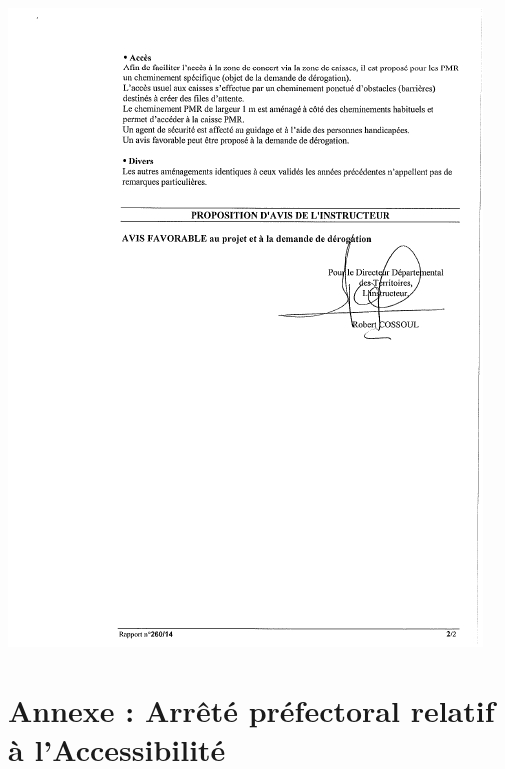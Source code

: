 \documentclass[hidelinks, paper=a4, fontsize=13pt]{report}
\begin{document}
\begin{center}
\includegraphics[scale=0.95]{Annexes/Documents/SCDAcces3}
\end{center}
\newpage
\section{Annexe : Arrêté préfectoral relatif à l'Accessibilité}
\end{document}
